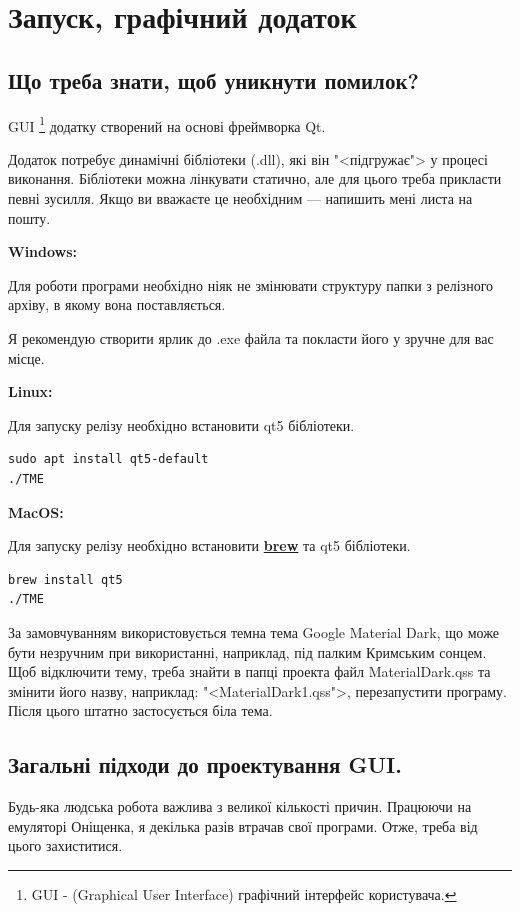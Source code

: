 \documentclass[oneside,final,14pt]{extreport}
\begin{document}
\chapter{Запуск, графічний додаток}
\section{Що треба знати, щоб уникнути помилок?}
GUI
\footnote{GUI - (Graphical User Interface) графічний інтерфейс користувача.}
 додатку створений на основі фреймворка Qt.

Додаток потребує динамічні бібліотеки (.dll), які він "<підгружає"> у процесі виконання. 
Бібліотеки можна лінкувати статично, але для цього треба прикласти певні зусилля. Якщо ви вважаєте це необхідним --- напишить мені листа на пошту.

\textbf{Windows:}

Для роботи програми необхідно ніяк не змінювати структуру папки з релізного архіву, в якому вона поставляється.

Я рекомендую створити ярлик до .exe файла та покласти його у зручне для вас місце.

\textbf{Linux:}

Для запуску релізу необхідно встановити qt5 бібліотеки.
\begin{tcolorbox}	
\begin{verbatim}
sudo apt install qt5-default
./TME
\end{verbatim}
\end{tcolorbox}

\textbf{MacOS:}

Для запуску релізу необхідно встановити \textbf{\href{https://brew.sh}{brew}} та qt5 бібліотеки.
\begin{tcolorbox}	
\begin{verbatim}
brew install qt5
./TME
\end{verbatim}
\end{tcolorbox}
		
За замовчуванням використовується темна тема Google Material Dark, що може бути незручним при використанні, наприклад, під палким Кримським сонцем. Щоб відключити тему, треба знайти в папці проекта файл MaterialDark.qss та змінити його назву, наприклад: "<MaterialDark1.qss">, перезапустити програму. Після цього штатно застосується біла тема.

\section{Загальні підходи до проектування GUI.}
Будь-яка людська робота важлива з великої кількості причин. Працюючи на емуляторі Оніщенка, я декілька разів втрачав свої програми. Отже, треба від цього захиститися.
		
\end{document}
